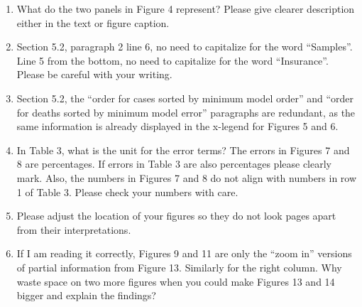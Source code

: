 \begin{enumerate}
\item \DOIT What do the two panels in Figure 4 represent? Please give clearer description either in the text or figure caption.

    \begin{quote}
    \end{quote}

\item \DOIT Section 5.2, paragraph 2 line 6, no need to capitalize for the word “Samples”. Line 5 from the bottom, no need to capitalize for the word “Insurance”. Please be careful with your writing.

    \begin{quote}
    \end{quote}

\item \DOIT Section 5.2, the “order for cases sorted by minimum model order” and “order for deaths sorted by minimum model error” paragraphs are redundant, as the same information is already displayed in the x-legend for Figures 5 and 6.

    \begin{quote}
    \end{quote}

\item \DOIT In Table 3, what is the unit for the error terms? The errors in Figures 7 and 8 are percentages. If errors in Table 3 are also percentages please clearly mark. Also, the numbers in Figures 7 and 8 do not align with numbers in row 1 of Table 3. Please check your numbers with care.

    \begin{quote}
    \end{quote}

\item \DOIT Please adjust the location of your figures so they do not look pages apart from their interpretations.

    \begin{quote}
    \end{quote}

\item \DOIT If I am reading it correctly, Figures 9 and 11 are only the “zoom in” versions of partial information from Figure 13. Similarly for the right column. Why waste space on two more figures when you could make Figures 13 and 14 bigger and explain the findings?


\end{enumerate}

